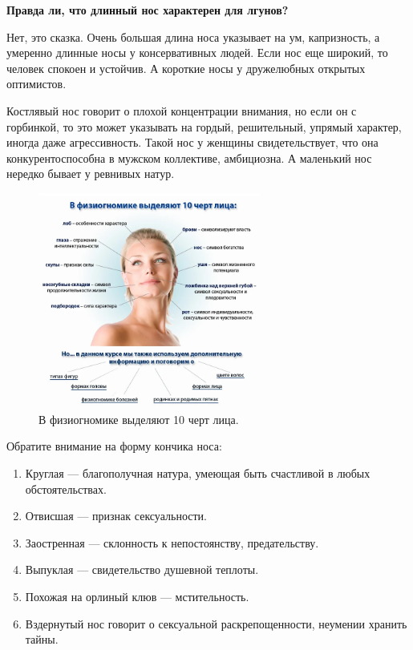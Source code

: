 \textbf{Правда ли, что длинный нос характерен для лгунов?}

Нет, это сказка. Очень большая длина носа указывает на ум, капризность, а умеренно длинные носы у консервативных людей. Если нос еще широкий, то человек спокоен и устойчив. А короткие носы у дружелюбных открытых оптимистов.

Костлявый нос говорит о плохой концентрации внимания, но если он с горбинкой, то это может указывать на гордый, решительный, упрямый характер, иногда даже агрессивность. Такой нос у женщины свидетельствует, что она конкурентоспособна в мужском коллективе, амбициозна. А маленький нос нередко бывает у ревнивых натур.


\begin{figure}
    \centering
    \includegraphics[width=0.65\textwidth]{img/face2.png}
    \caption{В физиогномике выделяют 10 черт лица.}
\end{figure}


Обратите внимание на форму кончика носа:
\begin{enumerate}
    \item Круглая — благополучная натура, умеющая быть счастливой в любых обстоятельствах.
    \item Отвисшая — признак сексуальности.
    \item Заостренная — склонность к непостоянству, предательству.
    \item Выпуклая — свидетельство душевной теплоты.
    \item Похожая на орлиный клюв — мстительность.
    \item Вздернутый нос говорит о сексуальной раскрепощенности, неумении хранить тайны.
\end{enumerate}

